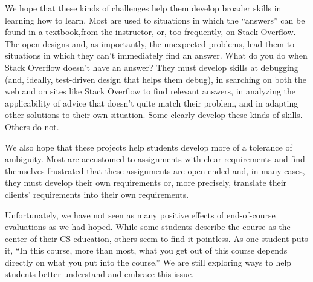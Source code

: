 We hope that these kinds of challenges help them develop broader
skills in learning how to learn.  Most are used to situations in
which the ``answers'' can be found in a textbook,from the instructor,
or, too frequently, on Stack Overflow.  The open designs and, as
importantly, the unexpected problems, lead them to situations in
which they can't immediately find an answer.  What do you do when
Stack Overflow doesn't have an answer?  They must develop skills
at debugging (and, ideally, test-driven design that helps them
debug), in searching on both the web and on sites like Stack Overflow
to find relevant answers, in analyzing the applicability of advice
that doesn't quite match their problem, and in adapting other
solutions to their own situation.  Some clearly develop these kinds
of skills.  Others do not.

We also hope that these projects help students develop more of a
tolerance of ambiguity.  Most are accustomed to assignments with
clear requirements and find themselves frustrated that these 
assignments are open ended and, in many cases, they must develop
their own requirements or, more precisely, translate their clients'
requirements into their own requirements.

Unfortunately, we have not seen as many positive effects of
end-of-course evaluations as we had hoped.  While some students
describe the course as the center of their CS education, others
seem to find it pointless.  As one student puts it, ``In this course,
more than most, what you get out of this course depends directly
on what you put into the course.''  We are still exploring ways to
help students better understand and embrace this issue.


